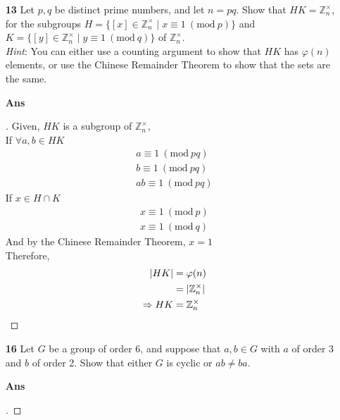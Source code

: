 \documentclass[paper=usletter, fontsize=12pt]{article}
\newcommand{\Mod}[1]{\ (\mathrm{mod}\ #1)}
\begin{document}
\begin{itemize}
\begin{itemize}
            \item[\textbf{13}] Let $p, q$ be distinct prime numbers, and let
            $n=pq$. Show that $HK=\mathbb{Z}_{n}^{\times}$, for the subgroups
            $H=\{[x] \in \mathbb{Z}_{n}^{\times} \mid x \equiv 1 \Mod p\}$ and
            $K=\{[y] \in \mathbb{Z}_{n}^{\times} \mid y \equiv 1 \Mod q\}$ of
            $\mathbb{Z}_{n}^{\times}$.\\ \textit{Hint}: You can either use a
            counting argument to show that $HK$ has $\varphi(n)$ elements, or
            use the Chinese Remainder Theorem to show that the sets are the
            same.
            \item[\textbf{Ans}]
            \begin{proof}[\unskip\nopunct]

                Given, $HK$ is a subgroup of $\mathbb{Z}_{n}^{\times}$,\\
                If $\forall a,b \in HK$
                \begin{align*}
                    a \equiv 1 \Mod {pq} \\
                    b \equiv 1 \Mod {pq} \\
                    ab \equiv 1 \Mod {pq}
                \end{align*}
                If $x \in H \cap K$
                \begin{align*}
                    x \equiv 1 \Mod p \\
                    x \equiv 1 \Mod q
                \end{align*}
                And by the Chinese Remainder Theorem, $x=1$\\
                Therefore,
                \begin{align*}
                    |HK| &=\varphi(n) \\
                    & = |\mathbb{Z}_{n}^{\times}|\\
                    \Rightarrow HK & = \mathbb{Z}_{n}^{\times} \qedhere
                \end{align*}

            \end{proof}
            \vspace{0.2in}

            \item[\textbf{16}] Let $G$ be a group of order 6, and suppose that
            $a, b \in G$ with $a$ of order 3 and $b$ of order 2. Show that
            either $G$ is cyclic or $ab \neq ba$.
            \item[\textbf{Ans}]
            \begin{proof}[\unskip\nopunct]


\end{proof}
\end{itemize}
\end{itemize}
\end{document}
